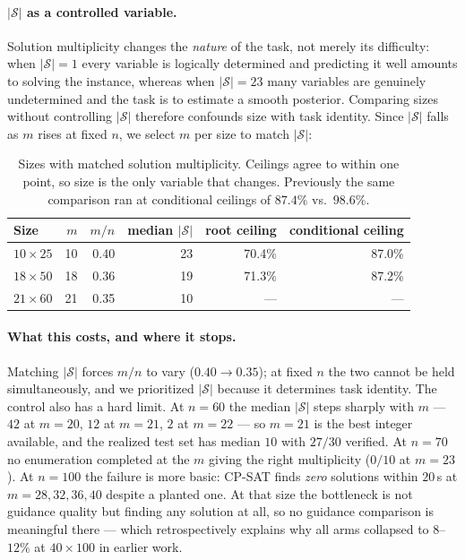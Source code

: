 \documentclass[12pt]{article}
\begin{document}
\paragraph{$|\mathcal{S}|$ as a controlled variable.} Solution multiplicity changes the \emph{nature} of the task, not merely its difficulty: when $|\mathcal{S}|=1$ every variable is logically determined and predicting it well amounts to solving the instance, whereas when $|\mathcal{S}|=23$ many variables are genuinely undetermined and the task is to estimate a smooth posterior. Comparing sizes without controlling $|\mathcal{S}|$ therefore confounds size with task identity. Since $|\mathcal{S}|$ falls as $m$ rises at fixed $n$, we select $m$ per size to match $|\mathcal{S}|$:

\begin{table}[h]
\centering
\begin{tabular}{lrrrrr}
\toprule
Size & $m$ & $m/n$ & median $|\mathcal{S}|$ & root ceiling & conditional ceiling \\
\midrule
$10\times25$ & 10 & 0.40 & 23 & 70.4\% & 87.0\% \\
$18\times50$ & 18 & 0.36 & 19 & 71.3\% & 87.2\% \\
$21\times60$ & 21 & 0.35 & 10 & --- & --- \\
\bottomrule
\end{tabular}
\caption{Sizes with matched solution multiplicity. Ceilings agree to within one point, so size is the only variable that changes. Previously the same comparison ran at conditional ceilings of $87.4\%$ vs.\ $98.6\%$.}
\label{tab:sizes}
\end{table}

\paragraph{What this costs, and where it stops.} Matching $|\mathcal{S}|$ forces $m/n$ to vary ($0.40\to0.35$); at fixed $n$ the two cannot be held simultaneously, and we prioritized $|\mathcal{S}|$ because it determines task identity. The control also has a hard limit. At $n=60$ the median $|\mathcal{S}|$ steps sharply with $m$ --- $42$ at $m=20$, $12$ at $m=21$, $2$ at $m=22$ --- so $m=21$ is the best integer available, and the realized test set has median $10$ with $27/30$ verified. At $n=70$ no enumeration completed at the $m$ giving the right multiplicity ($0/10$ at $m=23$). At $n=100$ the failure is more basic: CP-SAT finds \emph{zero} solutions within $20$\,s at $m=28,32,36,40$ despite a planted one. At that size the bottleneck is not guidance quality but finding any solution at all, so no guidance comparison is meaningful there --- which retrospectively explains why all arms collapsed to $8$--$12\%$ at $40\times100$ in earlier work.
\end{document}
